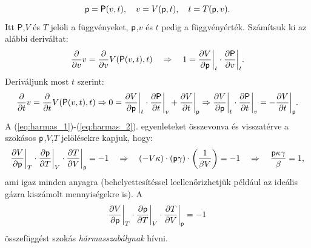 \begin{align}
    \mathsf p = \mathsf P(v,t),\quad v=V(\mathsf p,t),\quad t=T(\mathsf p,v).
\end{align}
Itt $\mathsf P$,$V$ és $T$ jelöli a függvényeket, $\mathsf p$,$v$ és $t$ pedig a függvényérték. Számítsuk ki az alábbi deriváltat:
\begin{align}\label{eq:harmas_1}
    \frac{\partial{}}{\partial{v}}v = \frac{\partial{}}{\partial{v}}V(\mathsf P(v,t),t)\quad\Rightarrow\quad 1 = \frac{\partial{V}}{\partial{\mathsf p}}\bigg|_t\cdot \frac{\partial{\mathsf P}}{\partial{v}}\bigg|_t.
\end{align}
Deriváljunk most $t$ szerint:
\begin{align}\label{eq:harmas_2}
    \frac{\partial{}}{\partial{t}}v = \frac{\partial{}}{\partial{t}}V(\mathsf P(v,t),t) \Rightarrow 0 = \frac{\partial{V}}{\partial{\mathsf p}}\bigg|_t\cdot \frac{\partial{\mathsf P}}{\partial{t}}\bigg|_v+\frac{\partial{V}}{\partial{t}}\bigg|_\mathsf p \Rightarrow \frac{\partial{V}}{\partial{\mathsf p}}\bigg|_t\cdot \frac{\partial{\mathsf P}}{\partial{t}}\bigg|_v = -\frac{\partial{V}}{\partial{t}}\bigg|_\mathsf p.
\end{align}
A (\ref{eq:harmas_1})-(\ref{eq:harmas_2}). egyenleteket összevonva és visszatérve a szokásos $\mathsf p$,$V$,$T$ jelölésekre kapjuk, hogy:
\begin{align}
    \frac{\partial{V}}{\partial{\mathsf p}}\bigg|_T\cdot \frac{\partial{\mathsf p}}{\partial{T}}\bigg|_V\cdot \frac{\partial{T}}{\partial{V}}\bigg|_\mathsf p = -1 \quad\Rightarrow\quad (-V\kappa)\cdot(\mathsf p\gamma)\cdot\left({\frac{1}{\beta V}}\right) = -1 \quad\Rightarrow\quad \frac{\mathsf p\kappa \gamma}{\beta} = 1,
\end{align}
ami igaz minden anyagra (behelyettesítéssel leellenőrizhetjük például az ideális gázra kiszámolt mennyiségekre is). A
\begin{align}
    \frac{\partial{V}}{\partial{\mathsf p}}\bigg|_T\cdot \frac{\partial{\mathsf p}}{\partial{T}}\bigg|_V\cdot \frac{\partial{T}}{\partial{V}}\bigg|_\mathsf p = -1
\end{align}
összefüggést szokás \emph{hármasszabálynak} hívni.

